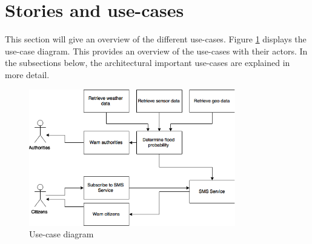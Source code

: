 

\clearpage


\section{Stories and use-cases}
This section will give an overview of the different use-cases. Figure \ref{fig:usecase-diagram} displays the use-case diagram. This provides an overview of the use-cases with their actors. In the subsections below, the architectural important use-cases are explained in more detail.

\begin{figure}[h]
\centering
\includegraphics[bb=0 0 545 361, width=90mm]{images/usecaseDiagram.png}
\caption{Use-case diagram}
\label{fig:usecase-diagram}
\end{figure}




